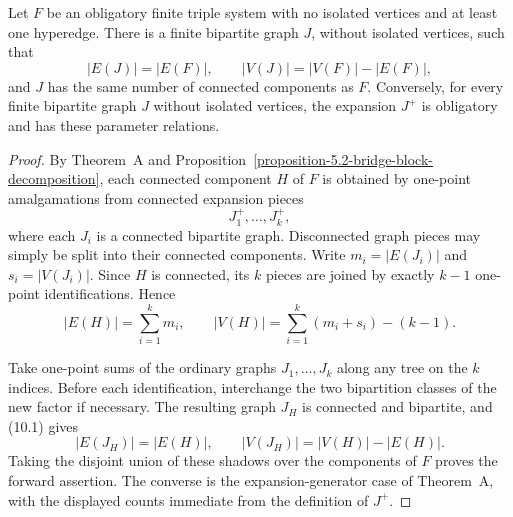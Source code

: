 \begin{lemma}
\label{lemma-bipartite-shadow}
Let $F$ be an obligatory finite triple system with no isolated vertices and
at least one hyperedge.  There is a finite bipartite graph $J$, without
isolated vertices, such that
\[
|E(J)|=|E(F)|,\qquad |V(J)|=|V(F)|-|E(F)|,
\]
and $J$ has the same number of connected components as $F$.  Conversely, for
every finite bipartite graph $J$ without isolated vertices, the expansion
$J^+$ is obligatory and has these parameter relations.
\end{lemma}
\begin{proof}
By Theorem~A and Proposition~\ref{proposition-5.2-bridge-block-decomposition},
each connected component $H$ of $F$ is obtained by one-point amalgamations
from connected expansion pieces
\[
J_1^+,\ldots,J_k^+,
\]
where each $J_i$ is a connected bipartite graph.  Disconnected graph pieces
may simply be split into their connected components.  Write
$m_i=|E(J_i)|$ and $s_i=|V(J_i)|$.  Since $H$ is connected, its $k$ pieces
are joined by exactly $k-1$ one-point identifications.  Hence
\[
|E(H)|=\sum_{i=1}^k m_i,
\qquad
|V(H)|=\sum_{i=1}^k(m_i+s_i)-(k-1).
\tag{10.1}
\]

Take one-point sums of the ordinary graphs $J_1,\ldots,J_k$ along any tree on
the $k$ indices.  Before each identification, interchange the two
bipartition classes of the new factor if necessary.  The resulting graph
$J_H$ is connected and bipartite, and (10.1) gives
\[
|E(J_H)|=|E(H)|,
\qquad
|V(J_H)|=|V(H)|-|E(H)|.
\]
Taking the disjoint union of these shadows over the components of $F$ proves
the forward assertion.  The converse is the expansion-generator case of
Theorem~A, with the displayed counts immediate from the definition of $J^+$.
\end{proof}

